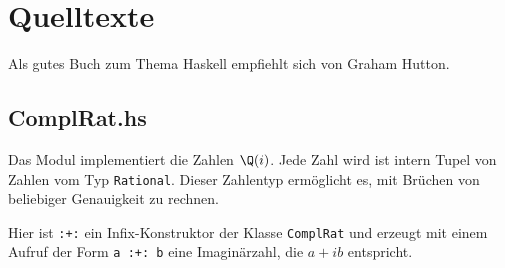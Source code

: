 \chapter{Quelltexte}
Als gutes Buch zum Thema Haskell empfiehlt sich \cite{Haskell1} von Graham Hutton.

\section{ComplRat.hs}
Das Modul  implementiert die Zahlen $\Q(i)$.
Jede Zahl wird ist intern Tupel von Zahlen vom Typ \texttt{Rational}. Dieser
Zahlentyp ermöglicht es, mit Brüchen von beliebiger Genauigkeit zu rechnen.

Hier ist \texttt{:+:} ein Infix-Konstruktor der Klasse \texttt{ComplRat} und
erzeugt mit einem Aufruf der Form \texttt{a :+: b} eine Imaginärzahl, die
$a+ib$ entspricht.

